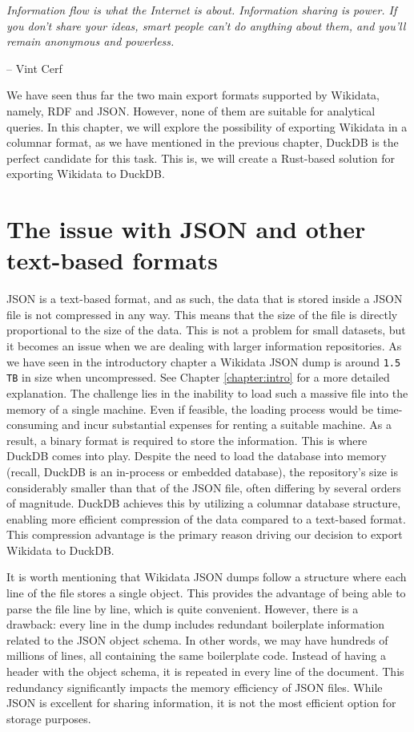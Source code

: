 \epigraph{\textit{Information flow is what the Internet is about. Information sharing is power. If you don't share your ideas, smart people can't do anything about them, and you'll remain anonymous and powerless.}}{-- \textup{Vint Cerf}}

We have seen thus far the two main export formats supported by Wikidata, namely, RDF and JSON. However, none of them are suitable for analytical queries. In this chapter, we will explore the possibility of exporting Wikidata in a columnar format, as we have mentioned in the previous chapter, DuckDB is the perfect candidate for this task. This is, we will create a Rust-based solution for exporting Wikidata to DuckDB.

\section{The issue with JSON and other text-based formats}
\label{section:issue}

JSON is a text-based format, and as such, the data that is stored inside a JSON file is not compressed in any way. This means that the size of the file is directly proportional to the size of the data. This is not a problem for small datasets, but it becomes an issue when we are dealing with larger information repositories. As we have seen in the introductory chapter a Wikidata JSON dump is around \texttt{1.5 TB} in size when uncompressed. See Chapter \ref{chapter:intro} for a more detailed explanation. The challenge lies in the inability to load such a massive file into the memory of a single machine. Even if feasible, the loading process would be time-consuming and incur substantial expenses for renting a suitable machine. As a result, a binary format is required to store the information. This is where DuckDB comes into play. Despite the need to load the database into memory (recall, DuckDB is an in-process or embedded database), the repository's size is considerably smaller than that of the JSON file, often differing by several orders of magnitude. DuckDB achieves this by utilizing a columnar database structure, enabling more efficient compression of the data compared to a text-based format. This compression advantage is the primary reason driving our decision to export Wikidata to DuckDB.

It is worth mentioning that Wikidata JSON dumps follow a structure where each line of the file stores a single object. This provides the advantage of being able to parse the file line by line, which is quite convenient. However, there is a drawback: every line in the dump includes redundant boilerplate information related to the JSON object schema. In other words, we may have hundreds of millions of lines, all containing the same boilerplate code. Instead of having a header with the object schema, it is repeated in every line of the document. This redundancy significantly impacts the memory efficiency of JSON files. While JSON is excellent for sharing information, it is not the most efficient option for storage purposes.

